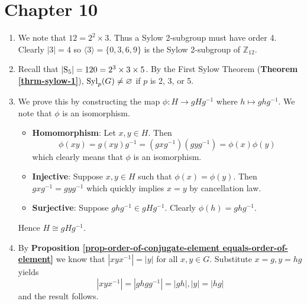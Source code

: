 \section*{Chapter 10}
\begin{enumerate}
    \item We note that $12 = 2^2 \times 3$. Thus a Sylow 2-subgroup must have order 4. Clearly $|3| = 4$ so $\langle 3 \rangle = \{0, 3, 6, 9\}$ is the Sylow 2-subgroup of $\mathbb{Z}_{12}$.

    \item Recall that $|\mathrm{S}_{5}| = 120 = 2^3 \times 3 \times 5$. By the First Sylow Theorem (\textbf{Theorem \ref{thrm-sylow-1}}), $\mathrm{Syl}_{p}(G) \neq \varnothing$ if $p$ is 2, 3, or 5.

    \item We prove this by constructing the map $\phi: H \to gHg^{-1}$ where $h \mapsto ghg^{-1}$. We note that $\phi$ is an isomorphism.
    \begin{itemize}
        \item \textbf{Homomorphism}: Let $x, y \in H$. Then
        \[
            \phi(xy) = g(xy)g^{-1} = (gxg^{-1})(gyg^{-1}) = \phi(x)\phi(y)
        \]
        which clearly means that $\phi$ is an isomorphism.
        \item \textbf{Injective}: Suppose $x, y \in H$ such that $\phi(x) = \phi(y)$. Then $gxg^{-1} = gyg^{-1}$ which quickly implies $x = y$ by cancellation law.
        \item \textbf{Surjective}: Suppose $ghg^{-1} \in gHg^{-1}$. Clearly $\phi(h) = ghg^{-1}$.
    \end{itemize}
    Hence $H \cong gHg^{-1}$.

    \item By \textbf{Proposition \ref{prop-order-of-conjugate-element equals-order-of-element}} we know that $|xyx^{-1}| = |y|$ for all $x, y \in G$. Substitute $x = g, y = hg$ yields
    \[
        |xyx^{-1}| = |ghgg^{-1}| = |gh|, |y| = |hg|
    \]
    and the result follows.


\end{enumerate}
